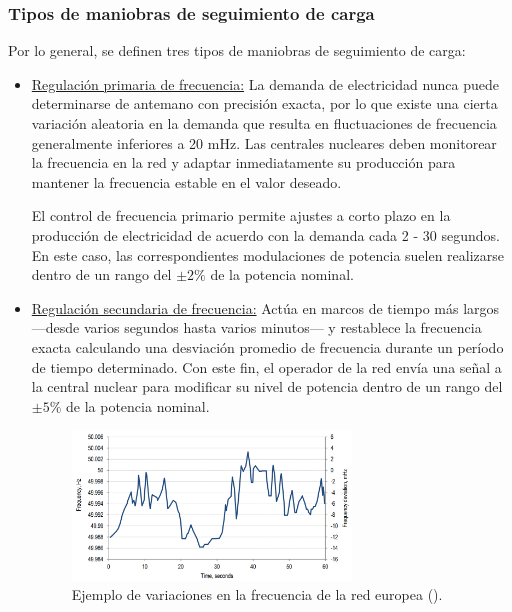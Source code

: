 \subsubsection{Tipos de maniobras de seguimiento de carga}

Por lo general, se definen tres tipos de maniobras de seguimiento de carga: 

\begin{itemize}
  \item \underline{Regulación primaria de frecuencia:} La demanda de electricidad nunca puede determinarse de antemano con precisión exacta, por lo que existe una cierta variación aleatoria en la demanda que resulta en fluctuaciones de frecuencia generalmente inferiores a 20 mHz. Las centrales nucleares deben monitorear la frecuencia en la red y adaptar inmediatamente su producción para mantener la frecuencia estable en el valor deseado. 
  
  El control de frecuencia primario permite ajustes a corto plazo en la producción de electricidad de acuerdo con la demanda cada 2 - 30 segundos.  En este caso, las correspondientes modulaciones de potencia suelen realizarse dentro de un rango del $\pm 2\%$ de la potencia nominal.
  \item \underline{Regulación secundaria de frecuencia:} Actúa en marcos de tiempo más largos ---desde varios segundos hasta varios minutos--- y restablece la frecuencia exacta calculando una desviación promedio de frecuencia durante un período de tiempo determinado. Con este fin, el operador de la red envía una señal a la central nuclear para modificar su nivel de potencia dentro de un rango del $\pm 5\%$ de la potencia nominal.
  
  \begin{figure}[h]
    \centering
    \includegraphics[width=0.7\textwidth]{content/figures/frequency_variation.png}
    \caption{Ejemplo de variaciones en la frecuencia de la red europea (\cite{NEA_2011_load_following}).}
    \label{fig:frequency_variations}
  \end{figure}


\end{itemize}
